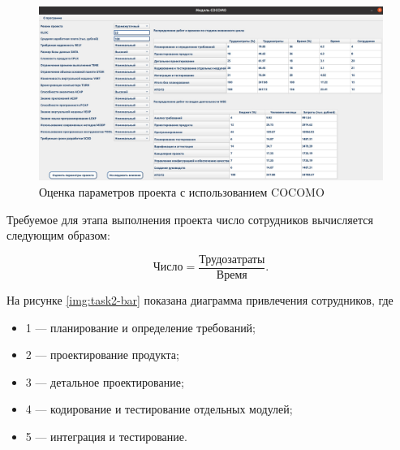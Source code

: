 \begin{figure}[H]
	\begin{center}
		\includegraphics[scale=0.18]{inc/img/task2.jpg}
	\end{center}
	\captionsetup{justification=centering}
	\caption{Оценка параметров проекта с использованием COCOMO}
	\label{img:task2}
\end{figure}

Требуемое для этапа выполнения проекта число сотрудников вычисляется следующим образом:

\begin{equation}
	\text{Число} = \frac{\text{Трудозатраты}}{\text{Время}}.
\end{equation}

На рисунке \ref{img:task2-bar} показана диаграмма привлечения сотрудников, где

\begin{itemize}
	\item 1 --- планирование и определение требований;
	\item 2 --- проектирование продукта;
	\item 3 --- детальное проектирование;
	\item 4 --- кодирование и тестирование отдельных модулей;
	\item 5 --- интеграция и тестирование.
\end{itemize}

